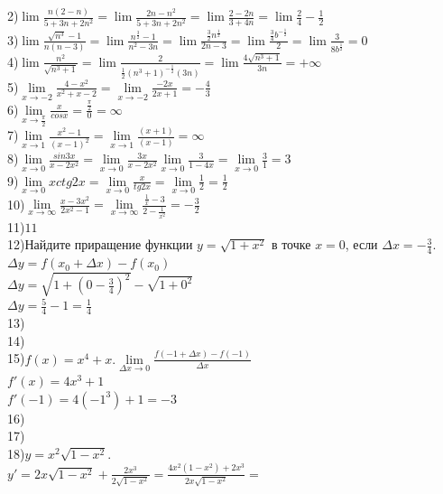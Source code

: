 \documentclass[a4paper]{article}
\begin{document}
    2)$\lim\frac{n(2-n)}{5+3n+2n^2}
    =\lim\frac{2n-n^2}{5+3n+2n^2}
    =\lim\frac{2-2n}{3+4n}
    =\lim\frac{2}{4}
    -\frac{1}{2}$\\
    3)$\lim\frac{\sqrt{n^3}-1}{n(n-3)}
    =\lim\frac{n^\frac{3}{2}-1}{n^2-3n}
    =\lim\frac{\frac{3}{2}n^\frac{1}{2}}{2n-3}
    =\lim\frac{\frac{3}{4}b^{-\frac{1}{2}}}{2}
    =\lim\frac{3}{8b^\frac{1}{2}}=0$\\
    4)$\lim\frac{n^2}{\sqrt{n^3+1}}
    =\lim\frac{2}{\frac{1}{2}(n^3+1)^{-\frac{1}{2}}(3n)}
    =\lim\frac{4\sqrt{n^3+1}}{3n}=+\infty$\\
    5)$\lim\limits_{x\to -2}\frac{4-x^2}{x^2+x-2}
    =\lim\limits_{x\to -2}\frac{-2x}{2x+1}
    =-\frac{4}{3}$\\
    6)$\lim\limits_{x\to \frac{\pi}{2}}\frac{x}{cosx}
    =\frac{\frac{\pi}{2}}{0}=\infty$\\
    7)$\lim\limits_{x\to 1}\frac{x^2-1}{(x-1)^2}
    =\lim\limits_{x\to 1}\frac{(x+1)}{(x-1)}=\infty$\\
    8)$\lim\limits_{x\to 0}\frac{sin3x}{x-2x^2}
    =\lim\limits_{x\to 0}\frac{3x}{x-2x^2}
    \lim\limits_{x\to 0}\frac{3}{1-4x}
    =\lim\limits_{x\to 0}\frac{3}{1}
    =3$\\
    9)$\lim\limits_{x\to 0}xctg2x
    =\lim\limits_{x\to 0}\frac{x}{tg2x}
    =\lim\limits_{x\to 0}\frac{1}{2}
    =\frac{1}{2}$\\
    10)$\lim\limits_{x\to \infty}\frac{x-3x^2}{2x^2-1}
    =\lim\limits_{x\to \infty}\frac{\frac{1}{x}-3}{2-\frac{1}{x^2}}
    =-\frac{3}{2}$\\
    11)$11$\\
    12)Найдите приращение функции $y=\sqrt{1+x^2}$ в точке $x=0$, если $\Delta x=-\frac{3}{4}$.\\
    $\Delta y=f(x_0+\Delta x)-f(x_0)$\\
    $\Delta y=\sqrt{1+(0-\frac{3}{4})^2}-\sqrt{1+0^2}$\\
    $\Delta y=\frac{5}{4}-1=\frac{1}{4}$\\
    13)\\
    14)\\
    15)$f(x)=x^4+x. \lim\limits_{\Delta x\to 0}\frac{f(-1+\Delta x)-f(-1)}{\Delta x}$\\
    $f'(x)=4x^3+1$\\
    $f'(-1)=4(-1^3)+1=-3$\\
    16)\\
    17)\\
    18)$y=x^2\sqrt{1-x^2}.$\\
    $y'=2x\sqrt{1-x^2}+\frac{2x^3}{2\sqrt{1-x^2}}
    =\frac{4x^2(1-x^2)+2x^3}{2x\sqrt{1-x^2}}
    =\frac{}{}$
\end{document}
